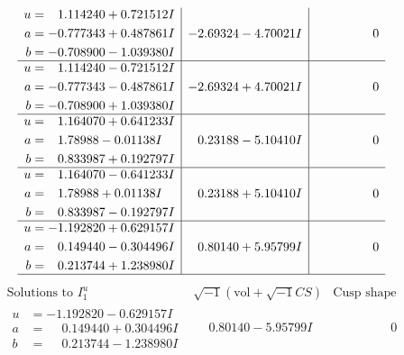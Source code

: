\documentclass[1p]{elsarticle_modified}
\theoremstyle{definition}
\newcommand{\I}{\sqrt{-1}}
\begin{document}
$$\begin{array}{c|c|c}
\begin{aligned}
u &= \phantom{-}1.114240 + 0.721512 I \\
a &= -0.777343 + 0.487861 I \\
b &= -0.708900 - 1.039380 I\end{aligned}
 & -2.69324 - 4.70021 I & \phantom{-0.000000 } 0 \\ \hline\begin{aligned}
u &= \phantom{-}1.114240 - 0.721512 I \\
a &= -0.777343 - 0.487861 I \\
b &= -0.708900 + 1.039380 I\end{aligned}
 & -2.69324 + 4.70021 I & \phantom{-0.000000 } 0 \\ \hline\begin{aligned}
u &= \phantom{-}1.164070 + 0.641233 I \\
a &= \phantom{-}1.78988 - 0.01138 I \\
b &= \phantom{-}0.833987 + 0.192797 I\end{aligned}
 & \phantom{-}0.23188 - 5.10410 I & \phantom{-0.000000 } 0 \\ \hline\begin{aligned}
u &= \phantom{-}1.164070 - 0.641233 I \\
a &= \phantom{-}1.78988 + 0.01138 I \\
b &= \phantom{-}0.833987 - 0.192797 I\end{aligned}
 & \phantom{-}0.23188 + 5.10410 I & \phantom{-0.000000 } 0 \\ \hline\begin{aligned}
u &= -1.192820 + 0.629157 I \\
a &= \phantom{-}0.149440 - 0.304496 I \\
b &= \phantom{-}0.213744 + 1.238980 I\end{aligned}
 & \phantom{-}0.80140 + 5.95799 I & \phantom{-0.000000 } 0\\
 \hline 
 \end{array}$$\newpage$$\begin{array}{c|c|c}  
\text{Solutions to }I^u_{1}& \I (\text{vol} + \sqrt{-1}CS) & \text{Cusp shape}\\
 \hline 
\begin{aligned}
u &= -1.192820 - 0.629157 I \\
a &= \phantom{-}0.149440 + 0.304496 I \\
b &= \phantom{-}0.213744 - 1.238980 I\end{aligned}
 & \phantom{-}0.80140 - 5.95799 I & \phantom{-0.000000 } 0 \\ \hline\begin{aligned}

\end{aligned}
\end{array}$$
\end{document}
